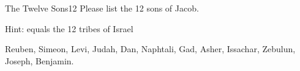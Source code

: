 \begin{question}{The Twelve Sons}{12}
Please list the 12 sons of Jacob.

\begin{hint}
Hint: equals the 12 tribes of Israel
\end{hint}

\end{question}

 

\begin{answer}
Reuben, Simeon, Levi, Judah, Dan, Naphtali, Gad, Asher, Issachar, Zebulun, Joseph, Benjamin.
\end{answer}



